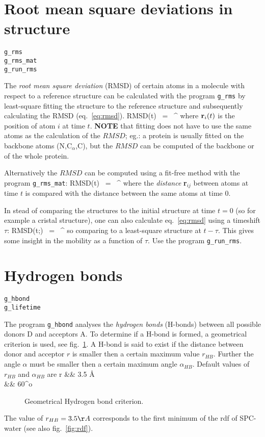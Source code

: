 \section{Root mean square deviations in structure}
\label{sec:rmsd}
\begin{verbatim}
g_rms
g_rms_mat
g_run_rms
\end{verbatim}
The {\em root mean square deviation} (RMSD) of certain atoms in a molecule
with respect to a reference structure can be calculated with the program 
{\tt g\_rms} by least-square fitting the structure to the reference structure
and subsequently calculating the RMSD (eq.~\ref{eq:rmsd}).
\beq
RMSD(t)	~=~ \left[\frac{1}{N} \sum_{i=1}^N ({\bf r}_i(t)-{\bf r}_i(0))^2 \right]^{}
\label{eq:rmsd}
\eeq
where ${\bf r}_i(t)$ is the position of atom $i$ at time $t$.
{\bf NOTE} that fitting does not have to use the same atoms as the calculation
of the $RMSD$; eg.: a protein is usually fitted on the backbone atoms
(N,C$_{\alpha}$,C), but the $RMSD$ can be computed of the backbone
or of the whole protein.

Alternatively the $RMSD$ can be computed using a fit-free method with the 
program {\tt g\_rms\_mat}:
\beq
RMSD(t)	~=~	\left[\frac{1}{N^2}\sum_{i=1}^N	\sum_{j=1}^N	({\bf r}_{ij}(t)-{\bf r}_{ij}(0))^2\right]^{}
\label{eq:rmsdff}
\eeq
where the {\em distance} {\bf r}$_{ij}$ between atoms at time $t$ 
is compared with the distance between the same atoms at time $0$.

In stead of comparing the structures to the initial structure at time $t=0$ 
(so for example a cristal structure), one can also calculate eq.~\ref{eq:rmsd} 
using a timeshift $\tau$:
\beq
RMSD(t;\tau) ~=~ \left[\frac{1}{N} \sum_{i=1}^N ({\bf r}_i(t)-{\bf r}_i(t-\tau))^2 \right]^{}
\label{eq:rmdstau}
\eeq
so comparing to a least-square structure at $t-\tau$. This gives some insight 
in the mobility as a function of $\tau$. Use the program {\tt g\_run\_rms}.
%
%
\section{Hydrogen bonds}
\begin{verbatim}
g_hbond
g_lifetime
\end{verbatim}
The program {\tt g\_hbond} analyses the {\em hydrogen bonds} (H-bonds) 
between all possible donors D and acceptors A. 
To determine if a H-bond is formed, a 
geometrical criterion is used, see fig.~\ref{fig:hbond}. A H-bond is said to 
exist if the distance between donor and acceptor $r$ is smaller then a certain 
maximum value $r_{HB}$. Further the angle $\alpha$ must be smaller then a 
certain maximum angle $\alpha_{HB}$. Default values of $r_{HB}$ and 
$\alpha_{HB}$ are
\bea
r &\leq& 3.5 \AA \nonumber\\
\alpha &\leq& 60^o \nonumber
\eea
%
\begin{figure}
\centerline{}
\caption{Geometrical Hydrogen bond criterion.}
\label{fig:hbond}
\end{figure}
%
The value of $r_{HB} = 3.5 \AA$ corresponds to the first minimum of the rdf of 
SPC-water (see also fig.~\ref{fig:rdf}).

